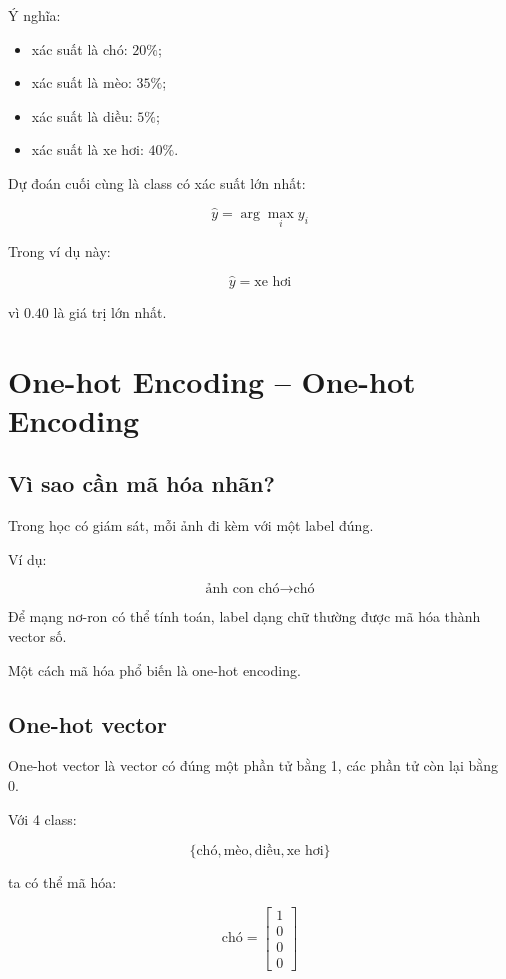 Ý nghĩa:

\begin{itemize}
    \item xác suất là chó: $20\%$;
    \item xác suất là mèo: $35\%$;
    \item xác suất là diều: $5\%$;
    \item xác suất là xe hơi: $40\%$.
\end{itemize}

Dự đoán cuối cùng là class có xác suất lớn nhất:

\[
    \hat{y} = \arg\max_i y_i
\]

Trong ví dụ này:

\[
    \hat{y} = \text{xe hơi}
\]

vì $0.40$ là giá trị lớn nhất.

\section{One-hot Encoding -- One-hot Encoding}

\subsection{Vì sao cần mã hóa nhãn?}

Trong học có giám sát, mỗi ảnh đi kèm với một label đúng.

Ví dụ:

\[
    \text{ảnh con chó} \rightarrow \text{chó}
\]

Để mạng nơ-ron có thể tính toán, label dạng chữ thường được mã hóa thành vector số.

Một cách mã hóa phổ biến là one-hot encoding.

\subsection{One-hot vector}

One-hot vector là vector có đúng một phần tử bằng 1, các phần tử còn lại bằng 0.

Với 4 class:

\[
    \{\text{chó}, \text{mèo}, \text{diều}, \text{xe hơi}\}
\]

ta có thể mã hóa:

\[
    \text{chó}
    =
    \begin{bmatrix}
    1\\0\\0\\0
    \end{bmatrix}
\]

